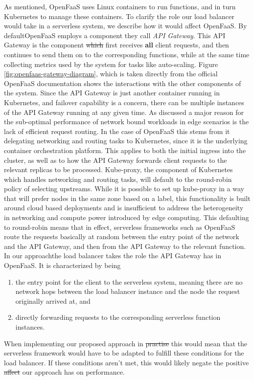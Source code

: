 \documentclass[draft,final]{vutinfth} %
\providecommand{\DIFaddtex}[1]{{\protect\color{blue}\uwave{#1}}} %
\providecommand{\DIFdeltex}[1]{{\protect\color{red}\sout{#1}}}                      %
\providecommand{\DIFaddbegin}{} %
\providecommand{\DIFaddend}{} %
\providecommand{\DIFdelbegin}{} %
\providecommand{\DIFdelend}{} %
\providecommand{\DIFadd}[1]{\texorpdfstring{\DIFaddtex{#1}}{#1}} %
\providecommand{\DIFdel}[1]{\texorpdfstring{\DIFdeltex{#1}}{}} %
\begin{document}
As mentioned, OpenFaaS uses Linux containers to run functions, and in turn Kubernetes to manage these containers. To clarify the role our load balancer would take in a serverless system, we describe how it would affect OpenFaaS. By default\DIFaddbegin \DIFadd{, }\DIFaddend OpenFaaS employs a component they call \textit{API Gateway}. This API Gateway is the component \DIFdelbegin \DIFdel{which }\DIFdelend \DIFaddbegin \DIFadd{that }\DIFaddend first receives \textbf{all} client requests, and then continues to send them on to the corresponding functions, while at the same time collecting metrics used by the system for tasks like auto-scaling. Figure \ref{fig:openfaas-gateway-diagram}, which is taken directly from the official OpenFaaS documentation shows the interactions with the other components of the system. Since the API Gateway is just another container running in Kubernetes\cite{kubernetes}, and failover capability is a concern, there can be multiple instances of the API Gateway running at any given time.
As discussed a major reason for the sub-optimal performance of network bound workloads in edge scenarios is the lack of efficient request routing.
In the case of OpenFaaS this stems from it delegating networking and routing tasks to Kubernetes, since it is the underlying container orchestration platform. This applies to both the initial ingress into the cluster, as well as to how the API Gateway forwards client requests to the relevant replicas to be processed. Kube-proxy, the component of Kubernetes which handles networking and routing tasks, will default to the round-robin policy of selecting upstreams. While it is possible to set up kube-proxy in a way that will prefer nodes in the same zone based on a label, this functionality is built around cloud based deployments and is insufficient to address the heterogeneity in networking and compute power introduced by edge computing. This defaulting to round-robin means that in effect, serverless frameworks such as OpenFaaS route the requests basically at random between the entry point of the network and the API Gateway, and then from the API Gateway to the relevant function.\\
In our approach\DIFaddbegin \DIFadd{, }\DIFaddend the load balancer takes the role the API Gateway has in OpenFaaS. It is characterized by being
\begin{enumerate}
    \item the entry point for the client to the serverless system, meaning there are no network hops between the load balancer instance and the node the request originally arrived at, and
    \item directly forwarding requests to the corresponding serverless function instances.
\end{enumerate}
When implementing our proposed approach in \DIFdelbegin \DIFdel{practise }\DIFdelend \DIFaddbegin \DIFadd{practice }\DIFaddend this would mean that the serverless framework would have to be adapted to fulfill these conditions for the load balancer. If these conditions aren't met, this would likely negate the positive \DIFdelbegin \DIFdel{affect }\DIFdelend \DIFaddbegin \DIFadd{effect }\DIFaddend our approach has on performance.
\end{document}
